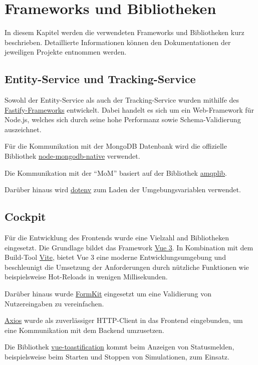\section{Frameworks und Bibliotheken}

In diesem Kapitel werden die verwendeten Frameworks und Bibliotheken kurz beschrieben.
Detaillierte Informationen können den Dokumentationen der jeweiligen Projekte entnommen werden.

\subsection{Entity-Service und Tracking-Service}

Sowohl der Entity-Service als auch der Tracking-Service wurden mithilfe des \href{https://www.fastify.io}{Fastify-Frameworks} entwickelt.
Dabei handelt es sich um ein Web-Framework für Node.js, welches sich durch seine hohe Performanz sowie Schema-Vali\-dierung auszeichnet.

Für die Kommunikation mit der MongoDB Datenbank wird die offizielle Bibliothek \href{https://github.com/mongodb/node-mongodb-native}{node-mongodb-native} verwendet.

Die Kommunikation mit der \enquote{MoM} basiert auf der Bibliothek \href{https://amqp-node.github.io/amqplib/}{amqplib}.

Darüber hinaus wird \href{https://github.com/motdotla/dotenv}{dotenv} zum Laden der Umgebungsvariablen verwendet.

\subsection{Cockpit}

Für die Entwicklung des Frontends wurde eine Vielzahl and Bibliotheken eingesetzt.
Die Grundlage bildet das Framework \href{https://vuejs.org}{Vue 3}.
In Kombination mit dem Build-Tool \href{https://vitejs.dev}{Vite}, bietet Vue 3 eine moderne Entwicklungsumgebung und beschleunigt die Umsetzung der Anforderungen durch nützliche Funktionen wie beispielsweise Hot-Reloads in wenigen Millisekunden.

Darüber hinaus wurde \href{https://formkit.com}{FormKit} eingesetzt um eine Validierung von Nutzereingaben zu vereinfachen.

\href{https://github.com/axios/axios}{Axios} wurde als zuverlässiger HTTP-Client in das Frontend eingebunden, um eine Kommunikation mit dem Backend umzusetzen.

Die Bibliothek \href{https://github.com/Maronato/vue-toastification}{vue-toastification} kommt beim Anzeigen von Statusmelden, beispielsweise beim Starten und Stoppen von Simulationen, zum Einsatz.

